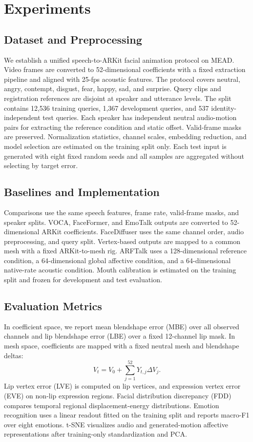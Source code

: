 \documentclass[conference]{IEEEtran}
\begin{document}
\section{Experiments}
\subsection{Dataset and Preprocessing}
We establish a unified speech-to-ARKit facial animation protocol on MEAD. Video frames are converted to 52-dimensional coefficients with a fixed extraction pipeline and aligned with 25-fps acoustic features. The protocol covers neutral, angry, contempt, disgust, fear, happy, sad, and surprise. Query clips and registration references are disjoint at speaker and utterance levels. The split contains 12,536 training queries, 1,367 development queries, and 537 identity-independent test queries. Each speaker has independent neutral audio-motion pairs for extracting the reference condition and static offset. Valid-frame masks are preserved. Normalization statistics, channel scales, embedding reduction, and model selection are estimated on the training split only. Each test input is generated with eight fixed random seeds and all samples are aggregated without selecting by target error.

\subsection{Baselines and Implementation}
Comparisons use the same speech features, frame rate, valid-frame masks, and speaker splits. VOCA, FaceFormer, and EmoTalk outputs are converted to 52-dimensional ARKit coefficients. FaceDiffuser uses the same channel order, audio preprocessing, and query split. Vertex-based outputs are mapped to a common mesh with a fixed ARKit-to-mesh rig. ARFTalk uses a 128-dimensional reference condition, a 64-dimensional global affective condition, and a 64-dimensional native-rate acoustic condition. Mouth calibration is estimated on the training split and frozen for development and test evaluation.

\subsection{Evaluation Metrics}
In coefficient space, we report mean blendshape error (MBE) over all observed channels and lip blendshape error (LBE) over a fixed 12-channel lip mask. In mesh space, coefficients are mapped with a fixed neutral mesh and blendshape deltas:
\begin{equation}
V_t=V_0+\sum_{j=1}^{52}Y_{t,j}\Delta V_j.
\end{equation}
Lip vertex error (LVE) is computed on lip vertices, and expression vertex error (EVE) on non-lip expression regions. Facial distribution discrepancy (FDD) compares temporal regional displacement-energy distributions. Emotion recognition uses a linear readout fitted on the training split and reports macro-F1 over eight emotions. t-SNE visualizes audio and generated-motion affective representations after training-only standardization and PCA.
\end{document}
